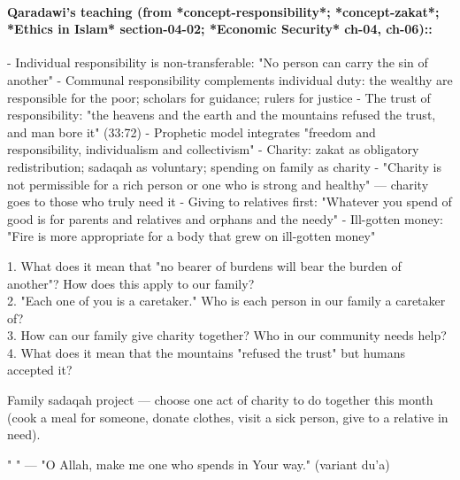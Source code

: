 \documentclass[11pt,a4paper]{article}
\begin{document}
\paragraph*{Qaradawi's teaching (from *concept-responsibility*; *concept-zakat*; *Ethics in Islam* section-04-02; *Economic Security* ch-04, ch-06)::}  - Individual responsibility is non-transferable: "No person can carry the sin of another" - Communal responsibility complements individual duty: the wealthy are responsible for the poor; scholars for guidance; rulers for justice - The trust of responsibility: "the heavens and the earth and the mountains refused the trust, and man bore it" (33:72) - Prophetic model integrates "freedom and responsibility, individualism and collectivism" - Charity: zakat as obligatory redistribution; sadaqah as voluntary; spending on family as charity - "Charity is not permissible for a rich person or one who is strong and healthy" --- charity goes to those who truly need it - Giving to relatives first: "Whatever you spend of good is for parents and relatives and orphans and the needy" - Ill-gotten money: "Fire is more appropriate for a body that grew on ill-gotten money"

\begin{discussionbox} 1. What does it mean that "no bearer of burdens will bear the burden of another"? How does this apply to our family? \\ 2. "Each one of you is a caretaker." Who is each person in our family a caretaker of? \\ 3. How can our family give charity together? Who in our community needs help? \\ 4. What does it mean that the mountains "refused the trust" but humans accepted it? \end{discussionbox}

\begin{activitybox} Family sadaqah project --- choose one act of charity to do together this month (cook a meal for someone, donate clothes, visit a sick person, give to a relative in need). \end{activitybox}

\begin{duabox} "    " --- "O Allah, make me one who spends in Your way." (variant du'a) \end{duabox}

\vspace{6pt}\noindent{\color{border}\rule{\textwidth}{0.5pt}}\vspace{6pt}
\end{document}
